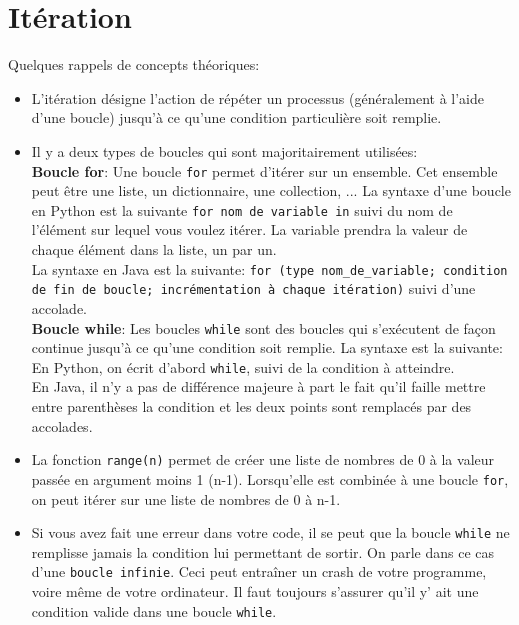     \section{Itération}
    
    Quelques rappels de concepts théoriques: \\
    
    \begin{itemize}
    	\item L'itération désigne l'action de répéter un processus (généralement à l'aide d'une boucle) jusqu'à ce qu'une condition particulière soit remplie.
    	\item Il y a deux types de boucles qui sont majoritairement utilisées: \\
    	
    	\textbf{Boucle for}: Une boucle \lstinline{for} permet d'itérer sur un ensemble. Cet ensemble peut être une liste, un dictionnaire, une collection, ... La syntaxe d'une boucle en Python est la suivante \lstinline{for nom de variable in} suivi du nom de l'élément sur lequel vous voulez itérer. La variable prendra la valeur de chaque élément dans la liste, un par un. \\
    	
    	
             	
     	La syntaxe en Java est la suivante: \lstinline{for (type nom_de_variable; condition de fin de boucle; incrémentation à chaque itération)} suivi d'une accolade. \\
     	
        	 
        \textbf{Boucle while}: Les boucles \lstinline{while} sont des boucles qui s’exécutent de façon continue jusqu’à ce qu’une condition soit remplie. La syntaxe est la suivante: En Python, on écrit d’abord \lstinline{while}, suivi de la condition à atteindre.\\
     	
     	En Java, il n'y a pas de différence majeure à part le fait qu'il faille mettre entre parenthèses la condition et les deux points sont remplacés par des accolades. \\
     	
     	
     	\item La fonction \lstinline{range(n)} permet de créer une liste de nombres de 0 à la valeur passée en argument moins 1 (n-1). Lorsqu’elle est combinée à une boucle \lstinline{for}, on peut itérer sur une liste de nombres de 0 à n-1. \\
     	
     	\item Si vous avez fait une erreur dans votre code, il se peut que la boucle \lstinline{while} ne remplisse jamais la condition lui permettant de sortir. On parle dans ce cas d'une \lstinline{boucle infinie}. Ceci peut entraîner un crash de votre programme, voire même de votre ordinateur. Il faut toujours s'assurer qu'il y' ait une condition valide dans une boucle \lstinline{while}. \\\\
     	
     	\end{itemize}
     	
